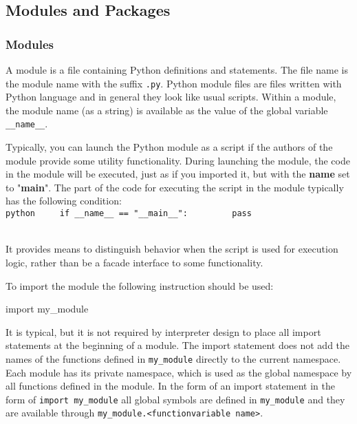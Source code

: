 \documentclass[
]{article}
\newenvironment{Shaded}{}{}
\newcommand{\ImportTok}[1]{#1}
\newcommand{\NormalTok}[1]{#1}
\begin{document}
\hypertarget{modules-and-packages}{%
\subsection{Modules and Packages}\label{modules-and-packages}}

\hypertarget{modules}{%
\subsubsection{Modules}\label{modules}}

A module is a file containing Python definitions and statements. The
file name is the module name with the suffix \texttt{.py}. Python module
files are files written with Python language and in general they look
like usual scripts. Within a module, the module name (as a string) is
available as the value of the global variable \texttt{\_\_name\_\_}.

Typically, you can launch the Python module as a script if the authors
of the module provide some utility functionality. During launching the
module, the code in the module will be executed, just as if you imported
it, but with the \textbf{name} set to "\textbf{main}". The part of the
code for executing the script in the module typically has the following
condition:\\
\texttt{python
\ \ \ \ if\ \_\_name\_\_\ ==\ "\_\_main\_\_":
\ \ \ \ \ \ \ \ pass}\strut \\
It provides means to distinguish behavior when the script is used for
execution logic, rather than be a facade interface to some
functionality.

To import the module the following instruction should be used:

\begin{Shaded}
\begin{Highlighting}[]
 \ImportTok{import}\NormalTok{ my\_module}
\end{Highlighting}
\end{Shaded}

It is typical, but it is not required by interpreter design to place all
import statements at the beginning of a module. The import statement
does not add the names of the functions defined in \texttt{my\_module}
directly to the current namespace. Each module has its private
namespace, which is used as the global namespace by all functions
defined in the module. In the form of an import statement in the form of
\texttt{import\ my\_module} all global symbols are defined in
\texttt{my\_module} and they are available through
\texttt{my\_module.\textless{}function\textbar{}variable\ name\textgreater{}}.
\end{document}
